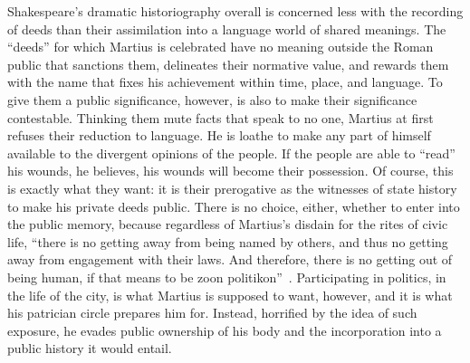 Shakespeare's dramatic historiography overall is concerned less with the recording of deeds than their assimilation into a language world of shared meanings.
The ``deeds'' for which Martius is celebrated have no meaning outside the Roman public that sanctions them, delineates their normative value, and rewards them with the name that fixes his achievement within time, place, and language.
To give them a public significance, however, is also to make their significance contestable.
Thinking them mute facts that speak to no one, Martius at first refuses their reduction to language.
He is loathe to make any part of himself available to the divergent opinions of the people.
If the people are able to ``read'' his wounds, he believes, his wounds will become their possession.
Of course, this is exactly what they want: it is their prerogative as the witnesses of state history to make his private deeds public.
There is no choice, either, whether to enter into the public memory, because regardless of Martius's disdain for the rites of civic life, ``there is no getting away from being named by others, and thus no getting away from engagement with their laws.
And therefore, there is no getting out of being human, if that means to be zoon politikon''~\cite[124]{pfannebecker_cyborg_2012}.
Participating in politics, in the life of the city, is what Martius is supposed to want, however, and it is what his patrician circle prepares him for.
Instead, horrified by the idea of such exposure, he evades public ownership of his body and the incorporation into a public history it would entail.

